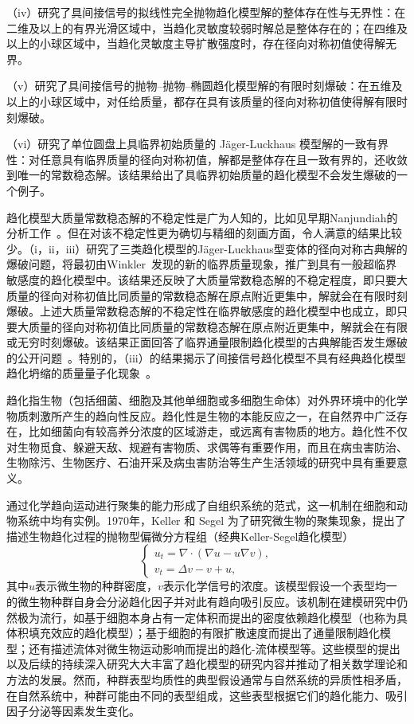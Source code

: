 \documentclass[12pt]{article}
\begin{document}
（iv）研究了具间接信号的拟线性完全抛物趋化模型解的整体存在性与无界性：在二维及以上的有界光滑区域中，当趋化灵敏度较弱时解总是整体存在的；在四维及以上的小球区域中，当趋化灵敏度主导扩散强度时，存在径向对称初值使得解无界。

（v）研究了具间接信号的抛物--抛物--椭圆趋化模型解的有限时刻爆破：在五维及以上的小球区域中，对任给质量，都存在具有该质量的径向对称初值使得解有限时刻爆破。

（vi）研究了单位圆盘上具临界初始质量的 J\"ager-Luckhaus 模型解的一致有界性：对任意具有临界质量的径向对称初值，解都是整体存在且一致有界的，还收敛到唯一的常数稳态解。该结果给出了具临界初始质量的趋化模型不会发生爆破的一个例子。

趋化模型大质量常数稳态解的不稳定性是广为人知的，比如见早期Nanjundiah的分析工作~\cite{Nanjundiah1973}。但在对该不稳定性更为确切与精细的刻画方面，令人满意的结果比较少。（i，ii，iii）研究了三类趋化模型的J\"ager-Luckhaus型变体的径向对称古典解的爆破问题，将最初由Winkler~\cite{Winkler2019}发现的新的临界质量现象，推广到具有一般超临界敏感度的趋化模型中。该结果还反映了大质量常数稳态解的不稳定程度，即只要大质量的径向对称初值比同质量的常数稳态解在原点附近更集中，解就会在有限时刻爆破。上述大质量常数稳态解的不稳定性在临界敏感度的趋化模型中也成立，即只要大质量的径向对称初值比同质量的常数稳态解在原点附近更集中，解就会在有限或无穷时刻爆破。该结果正面回答了临界通量限制趋化模型的古典解能否发生爆破的公开问题~\cite{Marras2023}。特别的，（iii）的结果揭示了间接信号趋化模型不具有经典趋化模型趋化坍缩的质量量子化现象~\cite{Nagai2000,Suzuki2013}。



趋化指生物（包括细菌、细胞及其他单细胞或多细胞生命体）对外界环境中的化学物质刺激所产生的趋向性反应。趋化性是生物的本能反应之一，在自然界中广泛存在，比如细菌向有较高养分浓度的区域游走，或远离有害物质的地方。趋化性不仅对生物觅食、躲避天敌、规避有害物质、求偶等有重要作用，而且在病虫害防治、生物除污、生物医疗、石油开采及病虫害防治等生产生活领域的研究中具有重要意义。

通过化学趋向运动进行聚集的能力形成了自组织系统的范式，这一机制在细胞和动物系统中均有实例。1970年，Keller 和 Segel 为了研究微生物的聚集现象，提出了描述生物趋化过程的抛物型偏微分方程组（经典Keller-Segel趋化模型）
\begin{equation}
    \label{sys: ks1970}
    \begin{cases}
        u_t = \nabla \cdot(\nabla u - u\nabla v), \\ 
        v_t = \Delta v - v + u,
    \end{cases}
\end{equation} 
其中$u$表示微生物的种群密度，$v$表示化学信号的浓度。该模型假设一个表型均一的微生物种群自身会分泌趋化因子并对此有趋向吸引反应。该机制在建模研究中仍然极为流行，如基于细胞本身占有一定体积而提出的密度依赖趋化模型（也称为具体积填充效应的趋化模型）；基于细胞的有限扩散速度而提出了通量限制趋化模型；还有描述流体对微生物运动影响而提出的趋化-流体模型等。这些模型的提出以及后续的持续深入研究大大丰富了趋化模型的研究内容并推动了相关数学理论和方法的发展。然而，种群表型均质性的典型假设通常与自然系统的异质性相矛盾，在自然系统中，种群可能由不同的表型组成，这些表型根据它们的趋化能力、吸引因子分泌等因素发生变化。
\end{document}
